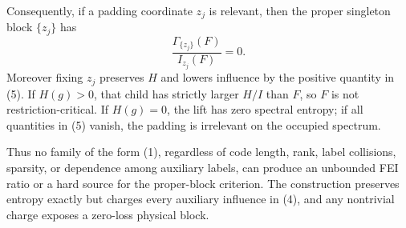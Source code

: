 Consequently, if a padding coordinate $z_j$ is relevant, then the proper
singleton block $\{z_j\}$ has
\[
 \frac{\Gamma_{\{z_j\}}(F)}{I_{z_j}(F)}=0.              \tag{9}
\]
Moreover fixing $z_j$ preserves $H$ and lowers influence by the positive
quantity in (5).  If $H(g)>0$, that child has strictly larger $H/I$ than
$F$, so $F$ is not restriction-critical.  If $H(g)=0$, the lift has zero
spectral entropy; if all quantities in (5) vanish, the padding is irrelevant
on the occupied spectrum.

Thus no family of the form (1), regardless of code length, rank, label
collisions, sparsity, or dependence among auxiliary labels, can produce an
unbounded FEI ratio or a hard source for the proper-block criterion.  The
construction preserves entropy exactly but charges every auxiliary
influence in (4), and any nontrivial charge exposes a zero-loss physical
block.
